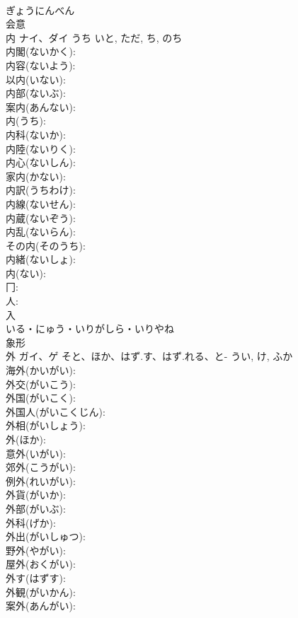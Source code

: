 \documentclass[8pt]{extreport}
\begin{document}
\begin{CJK}{UTF8}{min}
\\	ぎょうにんべん	
\\	会意 
\\	内	ナイ、ダイ	うち	いと, ただ, ち, のち	
\\	内閣(ないかく): 
\\	内容(ないよう): 
\\	以内(いない): 
\\	内部(ないぶ): 
\\	案内(あんない): 
\\	内(うち): 
\\	内科(ないか): 
\\	内陸(ないりく): 
\\	内心(ないしん): 
\\	家内(かない): 
\\	内訳(うちわけ): 
\\	内線(ないせん): 
\\	内蔵(ないぞう): 
\\	内乱(ないらん): 
\\	その内(そのうち): 
\\	内緒(ないしょ): 
\\	内(ない): 
\\	冂: 
\\	人: 
\\	入	
\\	いる・にゅう・いりがしら・いりやね	
\\	象形 
\\	外	ガイ、ゲ	そと、ほか、はず.す、はず.れる、と-	うい, け, ふか	
\\	海外(かいがい): 
\\	外交(がいこう): 
\\	外国(がいこく): 
\\	外国人(がいこくじん): 
\\	外相(がいしょう): 
\\	外(ほか): 
\\	意外(いがい): 
\\	郊外(こうがい): 
\\	例外(れいがい): 
\\	外貨(がいか): 
\\	外部(がいぶ): 
\\	外科(げか): 
\\	外出(がいしゅつ): 
\\	野外(やがい): 
\\	屋外(おくがい): 
\\	外す(はずす): 
\\	外観(がいかん): 
\\	案外(あんがい): 

\end{CJK}
\end{document}
